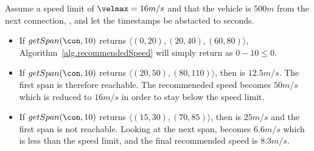 Assume a speed limit of $\velmax = 16 m/s$ and that the vehicle is $500 m$ from the next connection, \con, and let  the timestamps be abstacted to seconds.
\begin{itemize}
\item If $getSpan(\con, 10)$ returns $\langle(0,20), (20,40), (60,80)\rangle$, Algorithm~\ref{alg.recommendedSpeed} will simply return \velmax as $0-10 \leq 0$.
\item If $getSpan(\con, 10)$ returns $\langle(20,50), (80,110)\rangle$, then \velslow is $12.5 m/s$.
The first span is therefore reachable. 
The recommeneded speed becomes $50m/s$ which is reduced to $16 m/s$ in order to stay below the speed limit.
\item If $getSpan(\con, 10)$ returns $\langle(15,30), (70,85)\rangle$, then \velslow is $25 m/s$ and the first span is not reachable.
Looking at the next span, \velslow becomes $6.6m/s$ which is less than the speed limit, and the final recommended speed is $8.3 m/s$.
\end{itemize}

